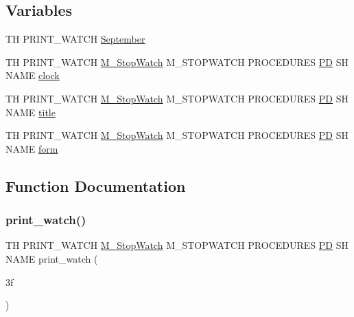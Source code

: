 \subsection*{Variables}
\begin{DoxyCompactItemize}
\item 
TH P\+R\+I\+N\+T\+\_\+\+W\+A\+T\+CH \hyperlink{print__watch_83_8txt_a979898727a2377f66aeb90c0f2b7fb1f}{September}
\item 
TH P\+R\+I\+N\+T\+\_\+\+W\+A\+T\+CH \hyperlink{option__stopwatch_83_8txt_aa2011fc45a5e502e87ee50996a8a9305}{M\+\_\+\+Stop\+Watch} M\+\_\+\+S\+T\+O\+P\+W\+A\+T\+CH P\+R\+O\+C\+E\+D\+U\+R\+ES \hyperlink{what__overview_81_8txt_a85f26da5a4481fbdb0d9c79f2b94de3e}{PD} SH N\+A\+ME \hyperlink{print__watch_83_8txt_a6b008a5efeabe5de2785214b5e3ba69d}{clock}
\item 
TH P\+R\+I\+N\+T\+\_\+\+W\+A\+T\+CH \hyperlink{option__stopwatch_83_8txt_aa2011fc45a5e502e87ee50996a8a9305}{M\+\_\+\+Stop\+Watch} M\+\_\+\+S\+T\+O\+P\+W\+A\+T\+CH P\+R\+O\+C\+E\+D\+U\+R\+ES \hyperlink{what__overview_81_8txt_a85f26da5a4481fbdb0d9c79f2b94de3e}{PD} SH N\+A\+ME \hyperlink{print__watch_83_8txt_a15b5bd21156bb9fca6a755ab8c029a9c}{title}
\item 
TH P\+R\+I\+N\+T\+\_\+\+W\+A\+T\+CH \hyperlink{option__stopwatch_83_8txt_aa2011fc45a5e502e87ee50996a8a9305}{M\+\_\+\+Stop\+Watch} M\+\_\+\+S\+T\+O\+P\+W\+A\+T\+CH P\+R\+O\+C\+E\+D\+U\+R\+ES \hyperlink{what__overview_81_8txt_a85f26da5a4481fbdb0d9c79f2b94de3e}{PD} SH N\+A\+ME \hyperlink{print__watch_83_8txt_a8fdbaaece3b2ad2ab6982e68e7539f04}{form}
\end{DoxyCompactItemize}


\subsection{Function Documentation}
\mbox{\label{print__watch_83_8txt_a8615f1e2afa77ade01fc099f7805625e}} 
\subsubsection{\texorpdfstring{print\+\_\+watch()}{print\_watch()}}
{\footnotesize\ttfamily TH P\+R\+I\+N\+T\+\_\+\+W\+A\+T\+CH \hyperlink{option__stopwatch_83_8txt_aa2011fc45a5e502e87ee50996a8a9305}{M\+\_\+\+Stop\+Watch} M\+\_\+\+S\+T\+O\+P\+W\+A\+T\+CH P\+R\+O\+C\+E\+D\+U\+R\+ES \hyperlink{what__overview_81_8txt_a85f26da5a4481fbdb0d9c79f2b94de3e}{PD} SH N\+A\+ME print\+\_\+watch (\begin{DoxyParamCaption}\item[{3f}]{ }\end{DoxyParamCaption})}

